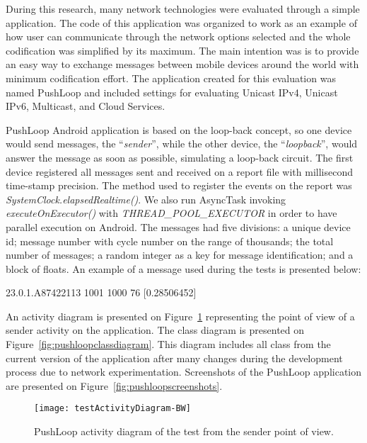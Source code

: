 During this research, many network technologies were evaluated through a simple application.
The code of this application was organized to work as an example of how user can communicate through the network options selected and the whole codification was simplified by its maximum.
The main intention was is to provide an easy way to exchange messages between mobile devices around the world with minimum codification effort.
The application created for this evaluation was named PushLoop and included settings for evaluating Unicast IPv4, Unicast IPv6, Multicast, and Cloud Services.

PushLoop Android application is based on the loop-back concept, so one device would send messages, the ``\textit{sender}'', while the other device, the ``\textit{loopback}'', would answer the message as soon as possible, simulating a loop-back circuit.
The first device registered all messages sent and received on a report file with millisecond time-stamp precision.
The method used to register the events on the report was \textit{SystemClock.elapsedRealtime()}.
We also run AsyncTask invoking \textit{executeOnExecutor()} with \textit{THREAD\_POOL\_EXECUTOR} in order to have parallel execution on Android.
The messages had five divisions: a unique device id; message number with cycle number on the range of thousands; the total number of messages; a random integer as a key for message identification; and a block of floats.
An example of a message used during the tests is presented below:

\begin{footnotesize}
	\begin{center}
		23.0.1.A87422113 1001 1000 76 [0.28506452]
	\end{center}
\end{footnotesize}

An activity diagram is presented on Figure~\ref{fig:pushloopactivityDiagram} representing the point of view of a sender activity on the application.
The class diagram is presented on Figure~\ref{fig:pushloopclassdiagram}.
This diagram includes all class from the current version of the application after many changes during the development process due to network experimentation.
Screenshots of the PushLoop application are presented on Figure~\ref{fig:pushloopscreenshots}.

\begin{figure}[!ht]
	\centering
	\texttt{[image: testActivityDiagram-BW]}
	\caption{PushLoop activity diagram of the test from the sender point of view.}
	\label{fig:pushloopactivityDiagram}
\end{figure}

